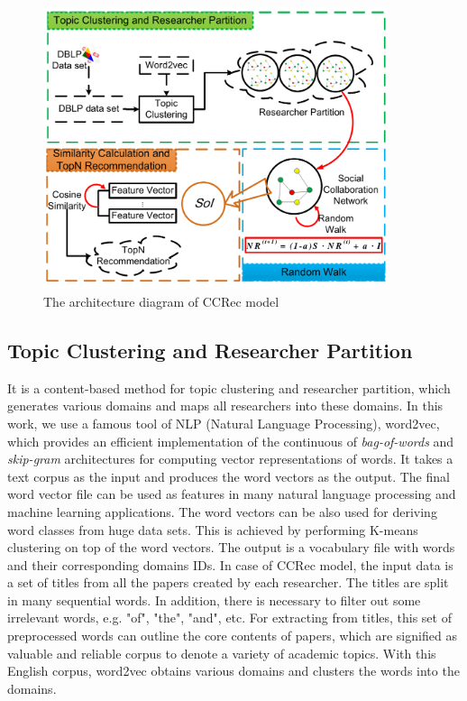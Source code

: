 \documentclass[review]{elsarticle}
\begin{document}
\begin{figure}
\centering
\includegraphics [width=4in]{Fig1.pdf}
\caption{The architecture diagram of CCRec model}
\end{figure}

\subsection{Topic Clustering and Researcher Partition}
It is a content-based method for topic clustering and researcher partition, which generates various domains and maps all researchers into these domains. In this work, we use a famous tool of NLP (Natural Language Processing), word2vec, which provides an efficient implementation of the continuous of \emph{bag-of-words} and \emph{skip-gram} architectures for computing vector representations of words. It takes a text corpus as the input and produces the word vectors as the output. The final word vector file can be used as features in many natural language processing and machine learning applications. The word vectors can be also used for deriving word classes from huge data sets. This is achieved by performing K-means clustering on top of the word vectors. The output is a vocabulary file with words and their corresponding domains IDs. In case of CCRec model, the input data is a set of titles from all the papers created by each researcher. The titles are split in many sequential words. In addition, there is necessary to filter out some irrelevant words, e.g. "of", "the", "and", etc. For extracting from titles, this set of preprocessed words can outline the core contents of papers, which are signified as valuable and reliable corpus to denote a variety of academic topics. With this English corpus, word2vec obtains various domains and clusters the words into the domains.
\end{document}
